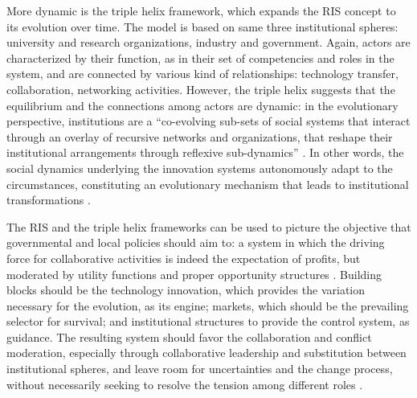 More dynamic is the triple helix framework, which expands the RIS concept to its evolution over time. The model is based on same three  institutional spheres: university and research organizations, industry and government. Again, actors are characterized by their function, as in their set of competencies and roles in the system, and are connected by various kind of relationships: technology transfer, collaboration, networking activities. However, the triple helix suggests that the equilibrium and the connections among actors are dynamic: in the evolutionary perspective, institutions are a \enquote{co-evolving sub-sets of social systems that interact through an overlay of recursive networks and organizations, that reshape their institutional arrangements through reflexive sub-dynamics} \citep{Ranga2013}. In other words, the social dynamics underlying the innovation systems autonomously adapt to the circumstances, constituting an evolutionary mechanism that leads to institutional transformations \citep{Etzkowitz2000}.

The RIS and the triple helix frameworks can be used to picture the objective that governmental and local policies should aim to: a system in which the driving force for collaborative activities is indeed the expectation of profits, but moderated by utility functions and proper opportunity structures \citep{Etzkowitz2000}. Building blocks should be the technology innovation, which provides the variation necessary for the evolution, as its engine; markets, which should be the prevailing selector for survival; and institutional structures to provide the control system, as guidance. The resulting system should favor the collaboration and conflict moderation, especially through collaborative leadership and substitution between institutional spheres, and leave room for uncertainties and the change process, without necessarily seeking to resolve the tension among different roles \citep{Ranga2013}. 
